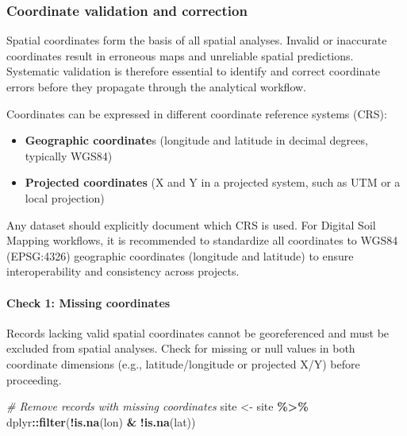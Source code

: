 \documentclass[
  10pt,
  b5paper,
  oneside]{book}
\newenvironment{Shaded}{\begin{snugshade}}{\end{snugshade}}
\newcommand{\CommentTok}[1]{\textcolor[rgb]{0.56,0.35,0.01}{\textit{#1}}}
\newcommand{\FunctionTok}[1]{\textcolor[rgb]{0.13,0.29,0.53}{\textbf{#1}}}
\newcommand{\NormalTok}[1]{#1}
\newcommand{\OtherTok}[1]{\textcolor[rgb]{0.56,0.35,0.01}{#1}}
\newcommand{\SpecialCharTok}[1]{\textcolor[rgb]{0.81,0.36,0.00}{\textbf{#1}}}
\providecommand{\tightlist}{%
  \setlength{\itemsep}{0pt}\setlength{\parskip}{0pt}}
\begin{document}
\subsubsection{Coordinate validation and correction}\label{coordinate-validation-and-correction}

Spatial coordinates form the basis of all spatial analyses. Invalid or inaccurate coordinates result in erroneous maps and unreliable spatial predictions. Systematic validation is therefore essential to identify and correct coordinate errors before they propagate through the analytical workflow.

Coordinates can be expressed in different coordinate reference systems (CRS):

\begin{itemize}
\tightlist
\item
  \textbf{Geographic coordinate}s (longitude and latitude in decimal degrees, typically WGS84)
\item
  \textbf{Projected coordinates} (X and Y in a projected system, such as UTM or a local projection)
\end{itemize}

Any dataset should explicitly document which CRS is used. For Digital Soil Mapping workflows, it is recommended to standardize all coordinates to WGS84 (EPSG:4326) geographic coordinates (longitude and latitude) to ensure interoperability and consistency across projects.

\paragraph*{Check 1: Missing coordinates}\label{check-1-missing-coordinates}

Records lacking valid spatial coordinates cannot be georeferenced and must be excluded from spatial analyses. Check for missing or null values in both coordinate dimensions (e.g., latitude/longitude or projected X/Y) before proceeding.

\begin{Shaded}
\begin{Highlighting}[]
  \CommentTok{\# Remove records with missing coordinates}
\NormalTok{  site }\OtherTok{\textless{}{-}}\NormalTok{ site }\SpecialCharTok{\%\textgreater{}\%}
\NormalTok{    dplyr}\SpecialCharTok{::}\FunctionTok{filter}\NormalTok{(}\SpecialCharTok{!}\FunctionTok{is.na}\NormalTok{(lon) }\SpecialCharTok{\&} \SpecialCharTok{!}\FunctionTok{is.na}\NormalTok{(lat))}
\end{Highlighting}
\end{Shaded}
\end{document}
